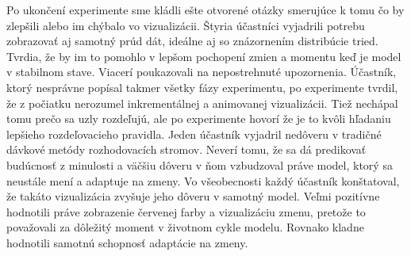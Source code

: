 Po ukončení experimente sme kládli ešte otvorené otázky smerujúce k tomu čo by zlepšili alebo im chýbalo vo vizualizácii. Štyria účastníci vyjadrili potrebu zobrazovať aj samotný prúd dát, ideálne aj so znázornením distribúcie tried. Tvrdia, že by im to pomohlo v lepšom pochopení zmien a momentu keď je model v stabilnom stave. Viacerí poukazovali na nepostrehnuté upozornenia. Účastník, ktorý nesprávne popísal takmer všetky fázy experimentu, po experimente tvrdil, že z počiatku nerozumel inkrementálnej a animovanej vizualizácii. Tiež nechápal tomu prečo sa uzly rozdeľujú, ale po experimente hovorí že je to kvôli hľadaniu lepšieho rozdeľovacieho pravidla. Jeden účastník vyjadril nedôveru v tradičné dávkové metódy rozhodovacích stromov. Neverí tomu, že sa dá predikovať budúcnosť z minulosti a väčšiu dôveru v ňom vzbudzoval práve model, ktorý sa neustále mení a adaptuje na zmeny. Vo všeobecnosti každý účastník konštatoval, že takáto vizualizácia zvyšuje jeho dôveru v samotný model. Veľmi pozitívne hodnotili práve zobrazenie červenej farby a vizualizáciu zmenu, pretože to považovali za dôležitý moment v životnom cykle modelu. Rovnako kladne hodnotili samotnú schopnosť adaptácie na zmeny.



























